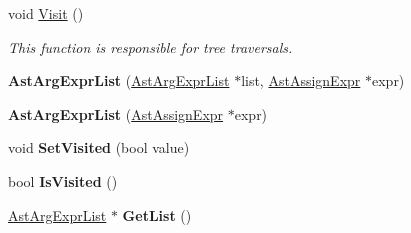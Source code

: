\begin{DoxyCompactItemize}
\item 
void \hyperlink{classAstArgExprList_aeac192a90197b0de59114cea84a1e577}{Visit} ()
\begin{DoxyCompactList}\small\item\em This function is responsible for tree traversals. \end{DoxyCompactList}\item 
\hypertarget{classAstArgExprList_a6aafae6eaadd5db52a33768136657610}{{\bfseries Ast\-Arg\-Expr\-List} (\hyperlink{classAstArgExprList}{Ast\-Arg\-Expr\-List} $\ast$list, \hyperlink{classAstAssignExpr}{Ast\-Assign\-Expr} $\ast$expr)}\label{classAstArgExprList_a6aafae6eaadd5db52a33768136657610}

\item 
\hypertarget{classAstArgExprList_a4acc4d03bbbe66b9a19e991d21169414}{{\bfseries Ast\-Arg\-Expr\-List} (\hyperlink{classAstAssignExpr}{Ast\-Assign\-Expr} $\ast$expr)}\label{classAstArgExprList_a4acc4d03bbbe66b9a19e991d21169414}

\item 
\hypertarget{classAstArgExprList_a373feb9ea4fdef7d6eede9be2a673ac9}{void {\bfseries Set\-Visited} (bool value)}\label{classAstArgExprList_a373feb9ea4fdef7d6eede9be2a673ac9}

\item 
\hypertarget{classAstArgExprList_a6be96ce331bf80a8ffd2314eab2fd8bf}{bool {\bfseries Is\-Visited} ()}\label{classAstArgExprList_a6be96ce331bf80a8ffd2314eab2fd8bf}

\item 
\hypertarget{classAstArgExprList_a07413ac154eea5ed2c43d83865b128e2}{\hyperlink{classAstArgExprList}{Ast\-Arg\-Expr\-List} $\ast$ {\bfseries Get\-List} ()}\label{classAstArgExprList_a07413ac154eea5ed2c43d83865b128e2}


\end{DoxyCompactItemize}
